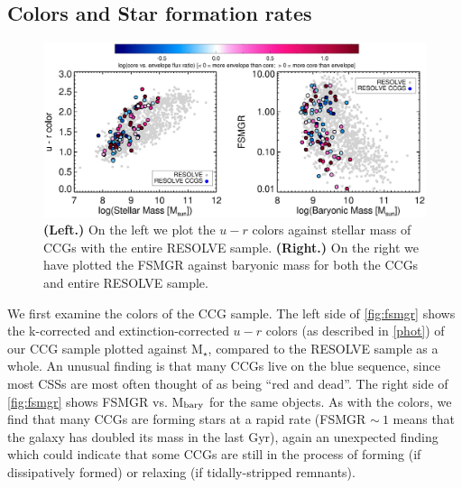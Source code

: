 \documentclass[iop,apj]{emulateapj}
\begin{document}
\subsection{Colors and Star formation rates}

\begin{figure}[hbpt!]
\begin{center}
\includegraphics[scale=0.65]{sfr_mbary.eps}
\caption{\textbf{(Left.)} On the left we plot the $u-r$ colors against stellar mass of CCGs with the entire RESOLVE sample. \textbf{(Right.)} On the right we have plotted the FSMGR against baryonic mass for both the CCGs and entire RESOLVE sample. }
\label{fig:fsmgr}
\end{center}
\end{figure}

 We first examine the colors of the CCG sample. The left side of \autoref{fig:fsmgr} shows the k-corrected and extinction-corrected $u-r$ colors (as described in \autoref{phot}) of our CCG sample plotted against M$_{\star}$, compared to the RESOLVE sample as a whole. An unusual finding is that many CCGs live on the blue sequence, since most CSSs are most often thought of as being ``red and dead''. The right side of \autoref{fig:fsmgr} shows FSMGR vs. M$_{\rm bary}$ for the same objects. As with the colors, we find that many CCGs are forming stars at a rapid rate (FSMGR $\sim~1$ means that the galaxy has doubled its mass in the last Gyr), again an unexpected finding which could indicate that some CCGs are still in the process of forming (if dissipatively formed) or relaxing (if tidally-stripped remnants).

\end{document}
